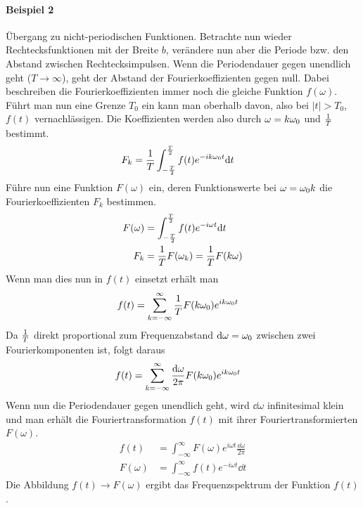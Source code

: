 \paragraph{Beispiel 2} Übergang zu nicht-periodischen
Funktionen. Betrachte nun wieder Rechtecksfunktionen mit der Breite $b$,
verändere nun aber die Periode bzw. den Abstand zwischen
Rechtecksimpulsen.
Wenn die Periodendauer gegen unendlich geht
($T\longrightarrow\infty$), geht der Abstand der Fourierkoeffizienten
gegen null. Dabei beschreiben die Fourierkoeffizienten immer noch die
gleiche Funktion $f(\omega)$. Führt man nun eine Grenze $T_0$ ein kann
man oberhalb davon, also bei $\vert t\vert >T_0$, $f(t)$
vernachlässigen. Die Koeffizienten werden also durch $\omega=k\omega_0$
und $\frac{1}{T}$ bestimmt. 
\begin{align*}
  F_k &= \frac{1}{T} \int_{-\frac{T}{2}}^{\frac{T}{2}} 
        f(t) e^{-ik\omega_0 t}\mathrm{d} t
\end{align*}
Führe nun eine Funktion $F(\omega)$ ein, deren Funktionswerte bei
$\omega=\omega_0 k$ die Fourierkoeffizienten $F_k$ bestimmen.
\begin{align*}
  F(\omega) &= \int_{-\frac{T}{2}}^{\frac{T}{2}}
              f(t)e^{-i\omega t}\mathrm{d} t\\
  F_k &= \frac{1}{T} F(\omega_k)        
        =\frac{1}{T}F(k\omega)
\end{align*}
Wenn man dies nun in $f(t)$ einsetzt erhält man
\begin{align*}
  f(t) &= \sum_{k=-\infty}^{\infty}
         \frac{1}{T} F(k\omega_0)e^{ik\omega_0 t}
\end{align*}
Da $\frac{1}{T}$ direkt proportional zum Frequenzabstand 
$\mathrm{d}\omega=\omega_0$ zwischen zwei Fourierkomponenten ist, folgt daraus
\begin{align*}
  f(t) &= \sum_{k=-\infty}^{\infty}
         \frac{\mathrm{d} \omega}{2\pi} F(k\omega_0) e^{ik\omega_0 t}
\end{align*}
Wenn nun die Periodendauer gegen unendlich geht, 
wird $\dd \omega$ infinitesimal klein und man erhält die
Fouriertransformation $f(t)$ mit ihrer Fouriertransformierten
$F(\omega)$.
\begin{align*}
  f(t) &= \int_{-\infty}^{\infty} 
         F(\omega)e^{i\omega t}\frac{\dd\omega}{2\pi}\\
  F(\omega) &= \int_{-\infty}^{\infty} 
              f(t)e^{-i\omega t}\dd t
\end{align*}
Die Abbildung $f(t)\longrightarrow F(\omega)$ ergibt das
Frequenzspektrum der Funktion $f(t)$.

